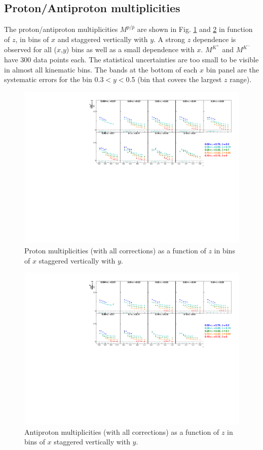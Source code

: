 \newpage

\subsection{Proton/Antiproton multiplicities}

The proton/antiproton multiplicities $M^{p/\bar{p}}$ are shown in Fig. \ref{pic:mpp} and \ref{pic:mpm} in function of $z$, in bins of $x$ and staggered vertically with $y$. A strong $z$ dependence is observed for all ($x$,$y$) bins as well as a small dependence with $x$. $M^{K^+}$ and $M^{K^-}$ have 300 data points each. The statistical uncertainties are too small to be visible in almost all kinematic bins. The bands at the bottom of each $x$ bin panel are the systematic errors for the bin 0.3$< y <$0.5 (bin that covers the largest $z$ range).

\begin{figure}[!h]
  \centering
	\includegraphics[scale=0.85]{./gfx/pp.pdf}
	\caption{Proton multiplicities (with all corrections) as a function of $z$ in bins of $x$ staggered vertically with $y$.}
	\label{pic:mpp}
\end{figure}

\begin{figure}[!h]
  \centering
	\includegraphics[scale=0.85]{./gfx/pm.pdf}
	\caption{Antiproton multiplicities (with all corrections) as a function of $z$ in bins of $x$ staggered vertically with $y$.}
	\label{pic:mpm}
\end{figure}

